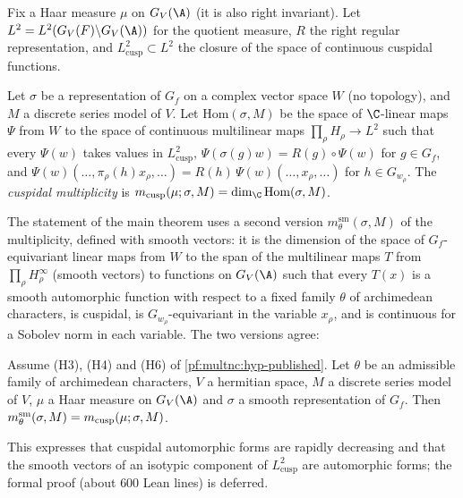 Fix a Haar measure $\mu$ on $G_V(\A)$ (it is also right invariant). Let $L^2=L^2(G_V(F)\backslash G_V(\A))$ for the
quotient measure, $R$ the right regular representation, and $L^2_{\mathrm{cusp}}\subset L^2$ the closure of the space of
continuous cuspidal functions.

\begin{definition}\label{pf:multnc:def-mult}
Let $\sigma$ be a representation of $G_f$ on a complex vector space $W$ (no topology), and $M$ a discrete series model of
$V$. Let $\mathrm{Hom}(\sigma,M)$ be the space of $\C$-linear maps $\Psi$ from $W$ to the space of continuous
multilinear maps $\prod_{\rho}H_\rho\to L^2$ such that every $\Psi(w)$ takes values in $L^2_{\mathrm{cusp}}$,
$\Psi(\sigma(g)w)=R(g)\circ\Psi(w)$ for $g\in G_f$, and
$\Psi(w)(\dots,\pi_\rho(h)x_\rho,\dots)=R(h)\,\Psi(w)(\dots,x_\rho,\dots)$ for $h\in G_{w_\rho}$. The \emph{cuspidal
multiplicity} is $\multncm(\mu;\sigma,M)=\dim_\C\mathrm{Hom}(\sigma,M)$.
\end{definition}

The statement of the main theorem uses a second version $m^{\mathrm{sm}}_\theta(\sigma,M)$ of the multiplicity, defined
with smooth vectors: it is the dimension of the space of $G_f$-equivariant linear maps from $W$ to the span of the
multilinear maps $T$ from $\prod_\rho H_\rho^{\infty}$ (smooth vectors) to functions on $G_V(\A)$ such that every $T(x)$
is a smooth automorphic function with respect to a fixed family $\theta$ of archimedean characters, is cuspidal, is
$G_{w_\rho}$-equivariant in the variable $x_\rho$, and is continuous for a Sobolev norm in each variable. The two
versions agree:

\begin{proposition}\label{pf:multnc:cuspmult}
Assume (H3), (H4) and (H6) of \cref{pf:multnc:hyp-published}. Let $\theta$ be an admissible family of archimedean
characters, $V$ a hermitian space, $M$ a discrete series model of $V$, $\mu$ a Haar measure on $G_V(\A)$ and $\sigma$ a
smooth representation of $G_f$. Then $m^{\mathrm{sm}}_\theta(\sigma,M)=m_{\mathrm{cusp}}(\mu;\sigma,M)$.
\end{proposition}

This expresses that cuspidal automorphic forms are rapidly decreasing and that the smooth vectors of an isotypic
component of $L^2_{\mathrm{cusp}}$ are automorphic forms; the formal proof (about $600$ Lean lines) is deferred.

